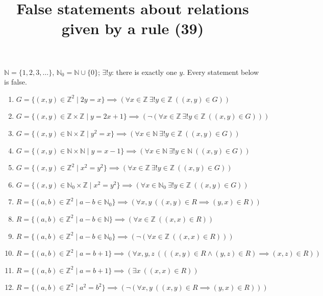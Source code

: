 \documentclass[11pt,a4paper]{article}
\title{False statements about relations given by a rule (39)}
\author{}
\date{}
\begin{document}
\maketitle
$\mathbb{N} = \{1, 2, 3, \ldots\}$, $\mathbb{N}_{0} = \mathbb{N} \cup \{0\}$; $\exists! y$: there is exactly one $y$. Every statement below is false.

\begin{enumerate}
\item $\displaystyle G = \{(x, y) \in \mathbb{Z}^{2} \mid 2y = x\} \implies (\forall x \in \mathbb{Z}\ \exists! y \in \mathbb{Z}\ ((x, y) \in G))$
\item $\displaystyle G = \{(x, y) \in \mathbb{Z} \times \mathbb{Z} \mid y = 2x + 1\} \implies (\lnot (\forall x \in \mathbb{Z}\ \exists! y \in \mathbb{Z}\ ((x, y) \in G)))$
\item $\displaystyle G = \{(x, y) \in \mathbb{N} \times \mathbb{Z} \mid y^{2} = x\} \implies (\forall x \in \mathbb{N}\ \exists! y \in \mathbb{Z}\ ((x, y) \in G))$
\item $\displaystyle G = \{(x, y) \in \mathbb{N} \times \mathbb{N} \mid y = x - 1\} \implies (\forall x \in \mathbb{N}\ \exists! y \in \mathbb{N}\ ((x, y) \in G))$
\item $\displaystyle G = \{(x, y) \in \mathbb{Z}^{2} \mid x^{2} = y^{2}\} \implies (\forall x \in \mathbb{Z}\ \exists! y \in \mathbb{Z}\ ((x, y) \in G))$
\item $\displaystyle G = \{(x, y) \in \mathbb{N}_{0} \times \mathbb{Z} \mid x^{2} = y^{2}\} \implies (\forall x \in \mathbb{N}_{0}\ \exists! y \in \mathbb{Z}\ ((x, y) \in G))$
\item $\displaystyle R = \{(a, b) \in \mathbb{Z}^{2} \mid a - b \in \mathbb{N}_{0}\} \implies (\forall x, y\ ((x, y) \in R \implies (y, x) \in R))$
\item $\displaystyle R = \{(a, b) \in \mathbb{Z}^{2} \mid a - b \in \mathbb{N}\} \implies (\forall x \in \mathbb{Z}\ ((x, x) \in R))$
\item $\displaystyle R = \{(a, b) \in \mathbb{Z}^{2} \mid a - b \in \mathbb{N}_{0}\} \implies (\lnot (\forall x \in \mathbb{Z}\ ((x, x) \in R)))$
\item $\displaystyle R = \{(a, b) \in \mathbb{Z}^{2} \mid a = b + 1\} \implies (\forall x, y, z\ (((x, y) \in R \land (y, z) \in R) \implies (x, z) \in R))$
\item $\displaystyle R = \{(a, b) \in \mathbb{Z}^{2} \mid a = b + 1\} \implies (\exists x\ ((x, x) \in R))$
\item $\displaystyle R = \{(a, b) \in \mathbb{Z}^{2} \mid a^{2} = b^{2}\} \implies (\lnot (\forall x, y\ ((x, y) \in R \implies (y, x) \in R)))$

\end{enumerate}
\end{document}
